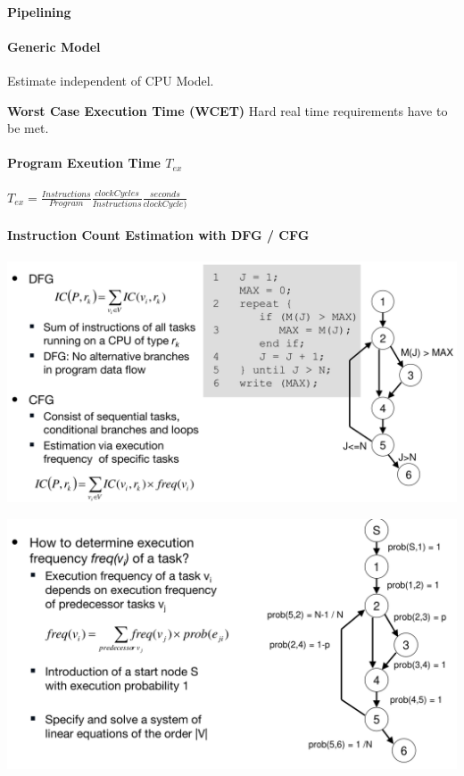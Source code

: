 \documentclass[english]{latex4ei/latex4ei_sheet}
\begin{document}
\paragraph{Pipelining}

\paragraph{Generic Model}
Estimate independent of CPU Model.

\textbf{Worst Case Execution Time (WCET)}
Hard real time requirements have to be met.

\paragraph{Program Exeution Time $T_{ex}$}
$T_{ex} = \frac{Instructions}{Program} \frac{clockCycles}{Instructions} \frac{seconds}{clockCycle)}$

\paragraph{Instruction Count Estimation with DFG / CFG}

\begin{center}
  \includegraphics[width=\linewidth]{assets/InstructionCountEstDFG.png}
  \label{fig:instructioncountestdfg}
\end{center}


\begin{center}
  \includegraphics[width=\linewidth]{assets/ICECFG.png}
  \label{fig:icecfg}
\end{center}


\end{document}
